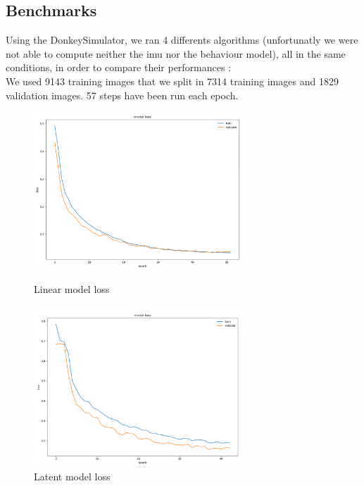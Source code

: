 \clearpage
\subsection{Benchmarks}

Using the DonkeySimulator, we ran 4 differents algorithms (unfortunatly we were not able to compute neither the imu nor the behaviour model), all in the same conditions, in order to compare their performances :\\
We used 9143 training images that we split in 7314 training images and 1829 validation images. 57 steps have been run each epoch.


\begin{figure}[!h]
\begin{minipage}{8cm}
\centering
\includegraphics[width=8cm]{img/model_bench/linear.png}
\caption{Linear model loss}
\label{Linear model loss}
\end{minipage}
\hspace*{1cm}
\begin{minipage}{8cm}
\centering
\includegraphics[width=8cm]{img/model_bench/latent.png}
\caption{Latent model loss}
\label{Latent model loss}
\end{minipage}
\end{figure}


